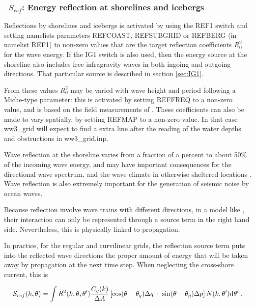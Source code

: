 \vsssub
\subsubsection{~$S_{ref}$: Energy reflection at shorelines and icebergs} \label{sec:REF1}
\vsssub


\noindent 
Reflections by shorelines and icebergs is activated by using the {\code REF1}
switch and setting namelists parameters {\code REFCOAST}, {\code REFSUBGRID}
or {\code REFBERG} (in namelist {\F REF1}) to non-zero values that are the
target reflection coefficients $R_0^2$ for the wave energy.  If the {\code
IG1} switch is also used, then the energy source at the shoreline also
includes free infragravity waves in both ingoing and outgoing directions.
That particular source is described in section
\ref{sec:IG1}.

From these values $R_0^2$ may be varied with wave height and period following
a Miche-type parameter: this is activated by setting {\code REFFREQ} to a
non-zero value, and is based on the field measurements of \cite{art:EHG94}.
These coefficients can also be made to vary spatially, by setting {\code
REFMAP} to a non-zero value. In that case ww3\_grid will expect to find a
extra line after the reading of the water depths and obstructions in
ww3\_grid.inp.

Wave reflection at the shoreline varies from a fraction of a percent to about
50\% of the incoming wave energy, and may have important consequences for the
directional wave spectrum, and the wave climate in otherwise sheltered
locations \citep{pro:ORe99}. Wave reflection is also extremely important for
the generation of seismic noise by ocean waves.

Because reflection involve wave trains with different directions, in a model
like \ws, their interaction can only be represented through a source term in
the right hand side. Nevertheless, this is physically linked to propagation.

In practice, for the regular and curvilinear grids, the reflection source term
puts into the reflected wave directions the proper amount of energy that will
be taken away by propagation at the next time step. When neglecting the
cross-shore current, this is

\begin{equation} 
{\cal S}_{ref}(k,\theta) = 
\int R^2(k,\theta,\theta') \frac{C_g(k)}{\Delta A} \left[\cos (\theta-\theta_q) \Delta q + \sin (\theta-\theta_p)  \Delta p \right] N(k,\theta') \mathrm{d} \theta' \; ,
\end{equation}

